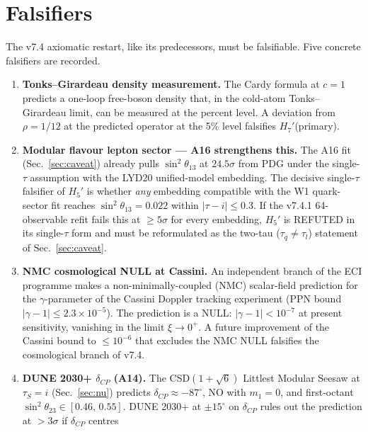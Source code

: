 \documentclass[a4paper,11pt]{article}
\theoremstyle{definition}
\theoremstyle{remark}
\begin{document}
\section{Falsifiers}
\label{sec:falsifiers}

The v7.4 axiomatic restart, like its predecessors, must be
falsifiable.  Five concrete falsifiers are recorded.

\begin{enumerate}
  \item \textbf{Tonks--Girardeau density measurement.}  The Cardy
    formula at $c=1$ predicts a one-loop free-boson density that, in
    the cold-atom Tonks--Girardeau limit, can be measured at the
    percent level.  A deviation from $\rho=1/12$ at the predicted
    operator at the 5\% level falsifies $H_7'$(primary).
  \item \textbf{Modular flavour lepton sector --- A16 strengthens
    this.}  The A16 fit (Sec.~\ref{sec:caveat}) already pulls
    $\sin^2\theta_{13}$ at $24.5\sigma$ from PDG under the
    single-$\tau$ assumption with the LYD20 unified-model embedding.
    The decisive single-$\tau$ falsifier of $H_5'$ is whether
    \emph{any} embedding compatible with the W1 quark-sector fit
    reaches $\sin^2\theta_{13}=0.022$ within $|\tau-i|\le 0.3$.  If
    the v7.4.1 64-observable refit fails this at $\ge 5\sigma$ for
    every embedding, $H_5'$ is REFUTED in its single-$\tau$ form
    and must be reformulated as the two-tau ($\tau_q\ne\tau_l$)
    statement of Sec.~\ref{sec:caveat}.
  \item \textbf{NMC cosmological NULL at Cassini.}  An independent
    branch of the ECI programme makes a non-minimally-coupled (NMC)
    scalar-field prediction for the $\gamma$-parameter of the Cassini
    Doppler tracking experiment (PPN bound $|\gamma-1|\le
    2.3\times 10^{-5}$).  The prediction is a NULL: $|\gamma-1|<
    10^{-7}$ at present sensitivity, vanishing in the limit
    $\xi\to 0^{+}$.  A future improvement of the Cassini
    bound to $\le 10^{-6}$ that excludes the NMC NULL falsifies
    the cosmological branch of v7.4.
  \item \textbf{DUNE 2030+ $\delta_{CP}$ (A14).}  The CSD$(1+\sqrt
    6)$ Littlest Modular Seesaw at $\tau_S=i$
    (Sec.~\ref{sec:nu}) predicts $\delta_{CP}\approx -87^{\circ}$,
    NO with $m_1=0$, and first-octant $\sin^2\theta_{23}\in
    [0.46,\,0.55]$.  DUNE 2030+ at $\pm 15^{\circ}$ on $\delta_{CP}$
    rules out the prediction at $>3\sigma$ if $\delta_{CP}$ centres

\end{enumerate}
\end{document}
